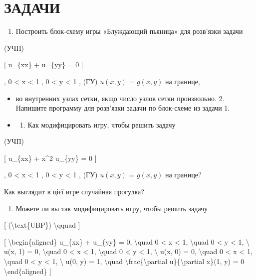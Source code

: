 \documentclass[
]{article}
\providecommand{\tightlist}{%
  \setlength{\itemsep}{0pt}\setlength{\parskip}{0pt}}
\begin{document}
\section{ЗАДАЧИ}\label{ux437ux430ux434ux430ux447ux438-19}

\begin{enumerate}
\def\labelenumi{\arabic{enumi}.}
\tightlist
\item
  Построить блок-схему игры «Блуждающий пьяница» для розв'язки задачи
\end{enumerate}

(УЧП)

{[} u\_\{xx\} + u\_\{yy\} = 0 {]}

, 0 \textless{} x \textless{} 1 , 0 \textless{} y \textless{} 1 , (ГУ)
\(u(x, y)\) = \(g(x, y)\) на границе,

\begin{itemize}
\item
  во внутренних узлах сетки, якщо число узлов сетки произвольно. 2.
  Напишите программу для розв'язки задачи по блок-схеме из задачи 1.
\item
  \begin{enumerate}
  \def\labelenumi{\arabic{enumi}.}
  \setcounter{enumi}{2}
  \tightlist
  \item
    Как модифицировать игру, чтобы решить задачу
  \end{enumerate}
\end{itemize}

(УЧП)

{[} u\_\{xx\} + x\^{}2 u\_\{yy\} = 0 {]}

, 0 \textless{} x \textless{} 1 , 0 \textless{} y \textless{} 1 , (ГУ)
\(u(x, y)\) = \(g(x, y)\) на границе?

Как выглядит в цієї игре случайная прогулка?

\begin{enumerate}
\def\labelenumi{\arabic{enumi}.}
\setcounter{enumi}{3}
\tightlist
\item
  Можете ли вы так модифицировать игру, чтобы решить задачу
\end{enumerate}

{[} (\textbackslash text\{UBP\}) \textbackslash qquad {]}

{[} \textbackslash begin\{aligned\} u\_\{xx\} + u\_\{yy\} = 0,
\textbackslash quad 0 \textless{} x \textless{} 1, \textbackslash quad 0
\textless{} y \textless{} 1, \textbackslash{} u(x, 1) = 0,
\textbackslash quad 0 \textless{} x \textless{} 1, \textbackslash quad 0
\textless{} y \textless{} 1, \textbackslash{} u(x, 0) = 0,
\textbackslash quad 0 \textless{} x \textless{} 1, \textbackslash quad 0
\textless{} y \textless{} 1, \textbackslash{} u(0, y) = 1,
\textbackslash quad \textbackslash frac\{\textbackslash partial
u\}\{\textbackslash partial x\}(1, y) = 0 \textbackslash end\{aligned\}
{]}
\end{document}

